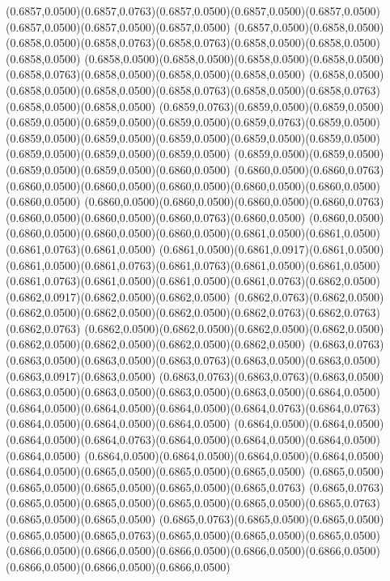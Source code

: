 (0.6857,0.0500)(0.6857,0.0763)(0.6857,0.0500)(0.6857,0.0500)(0.6857,0.0500)(0.6857,0.0500)(0.6857,0.0500)(0.6857,0.0500)
(0.6857,0.0500)(0.6858,0.0500)(0.6858,0.0500)(0.6858,0.0763)(0.6858,0.0763)(0.6858,0.0500)(0.6858,0.0500)(0.6858,0.0500)
(0.6858,0.0500)(0.6858,0.0500)(0.6858,0.0500)(0.6858,0.0500)(0.6858,0.0763)(0.6858,0.0500)(0.6858,0.0500)(0.6858,0.0500)
(0.6858,0.0500)(0.6858,0.0500)(0.6858,0.0500)(0.6858,0.0763)(0.6858,0.0500)(0.6858,0.0763)(0.6858,0.0500)(0.6858,0.0500)
(0.6859,0.0763)(0.6859,0.0500)(0.6859,0.0500)(0.6859,0.0500)(0.6859,0.0500)(0.6859,0.0500)(0.6859,0.0763)(0.6859,0.0500)
(0.6859,0.0500)(0.6859,0.0500)(0.6859,0.0500)(0.6859,0.0500)(0.6859,0.0500)(0.6859,0.0500)(0.6859,0.0500)(0.6859,0.0500)
(0.6859,0.0500)(0.6859,0.0500)(0.6859,0.0500)(0.6859,0.0500)(0.6860,0.0500)
\PST@Solid(0.6860,0.0500)(0.6860,0.0763)(0.6860,0.0500)(0.6860,0.0500)(0.6860,0.0500)(0.6860,0.0500)(0.6860,0.0500)(0.6860,0.0500)
(0.6860,0.0500)(0.6860,0.0500)(0.6860,0.0500)(0.6860,0.0763)(0.6860,0.0500)(0.6860,0.0500)(0.6860,0.0763)(0.6860,0.0500)
(0.6860,0.0500)(0.6860,0.0500)(0.6860,0.0500)(0.6860,0.0500)(0.6861,0.0500)(0.6861,0.0500)(0.6861,0.0763)(0.6861,0.0500)
(0.6861,0.0500)(0.6861,0.0917)(0.6861,0.0500)(0.6861,0.0500)(0.6861,0.0763)(0.6861,0.0763)(0.6861,0.0500)(0.6861,0.0500)
(0.6861,0.0763)(0.6861,0.0500)(0.6861,0.0500)(0.6861,0.0763)(0.6862,0.0500)(0.6862,0.0917)(0.6862,0.0500)(0.6862,0.0500)
(0.6862,0.0763)(0.6862,0.0500)(0.6862,0.0500)(0.6862,0.0500)(0.6862,0.0500)(0.6862,0.0763)(0.6862,0.0763)(0.6862,0.0763)
(0.6862,0.0500)(0.6862,0.0500)(0.6862,0.0500)(0.6862,0.0500)(0.6862,0.0500)(0.6862,0.0500)(0.6862,0.0500)(0.6862,0.0500)
(0.6863,0.0763)(0.6863,0.0500)(0.6863,0.0500)(0.6863,0.0763)(0.6863,0.0500)(0.6863,0.0500)(0.6863,0.0917)(0.6863,0.0500)
(0.6863,0.0763)(0.6863,0.0763)(0.6863,0.0500)(0.6863,0.0500)(0.6863,0.0500)(0.6863,0.0500)(0.6863,0.0500)(0.6864,0.0500)
(0.6864,0.0500)(0.6864,0.0500)(0.6864,0.0500)(0.6864,0.0763)(0.6864,0.0763)(0.6864,0.0500)(0.6864,0.0500)(0.6864,0.0500)
(0.6864,0.0500)(0.6864,0.0500)(0.6864,0.0500)(0.6864,0.0763)(0.6864,0.0500)(0.6864,0.0500)(0.6864,0.0500)(0.6864,0.0500)
(0.6864,0.0500)(0.6864,0.0500)(0.6864,0.0500)(0.6864,0.0500)(0.6864,0.0500)(0.6865,0.0500)(0.6865,0.0500)(0.6865,0.0500)
(0.6865,0.0500)(0.6865,0.0500)(0.6865,0.0500)(0.6865,0.0500)(0.6865,0.0763)
\PST@Solid(0.6865,0.0763)(0.6865,0.0500)(0.6865,0.0500)(0.6865,0.0500)(0.6865,0.0500)(0.6865,0.0763)(0.6865,0.0500)(0.6865,0.0500)
(0.6865,0.0763)(0.6865,0.0500)(0.6865,0.0500)(0.6865,0.0500)(0.6865,0.0763)(0.6865,0.0500)(0.6865,0.0500)(0.6865,0.0500)
(0.6866,0.0500)(0.6866,0.0500)(0.6866,0.0500)(0.6866,0.0500)(0.6866,0.0500)(0.6866,0.0500)(0.6866,0.0500)(0.6866,0.0500)
